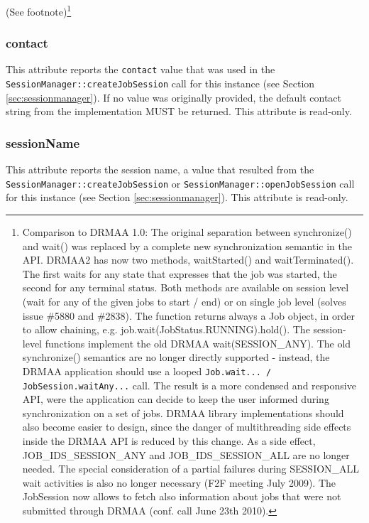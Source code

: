 \documentclass{article}
\newcommand{\h}[1]{\lstinline|#1|}
\newcommand{\rat}[1]{ {\tiny(See footnote)}\footnote{#1} }
\begin{document}
\rat{
Comparison to DRMAA 1.0: The original separation between synchronize() and wait() was replaced by a complete new synchronization semantic in the API. DRMAA2 has now two methods, waitStarted() and waitTerminated(). The first waits for any state that expresses that the job was started, the second for any terminal status. Both methods are available on session level (wait for any of the given jobs to start / end) or on single job level (solves issue \#5880 and \#2838). The function returns always a Job object, in order to allow chaining, e.g. job.wait(JobStatus.RUNNING).hold(). The session-level functions implement the old DRMAA wait(SESSION\_ANY). The old synchronize() semantics are no longer directly supported - instead, the DRMAA application should use a looped \h{Job.wait... / JobSession.waitAny...} call. The result is a more condensed and responsive API, were the application can decide to keep the user informed during synchronization on a set of jobs. DRMAA library implementations should also become easier to design, since the danger of multithreading side effects inside the DRMAA API is reduced by this change. As a side effect, JOB\_IDS\_SESSION\_ANY and JOB\_IDS\_SESSION\_ALL are no longer needed. The special consideration of a partial failures during SESSION\_ALL wait activities is also no longer necessary (F2F meeting July 2009). The JobSession now allows to fetch also information about jobs that were not submitted through DRMAA (conf. call June 23th 2010).}

\subsubsection{contact}

This attribute reports the \h{contact} value that was used in the \h{SessionManager::createJobSession} call for this instance (see Section \ref{sec:sessionmanager}). If no value was originally provided, the default contact string from the implementation MUST be returned. This attribute is read-only.

\subsubsection{sessionName}

This attribute reports the session name, a value that resulted from the \h{SessionManager::createJobSession} or \h{SessionManager::openJobSession} call for this instance (see Section \ref{sec:sessionmanager}). This attribute is read-only.
\end{document}
